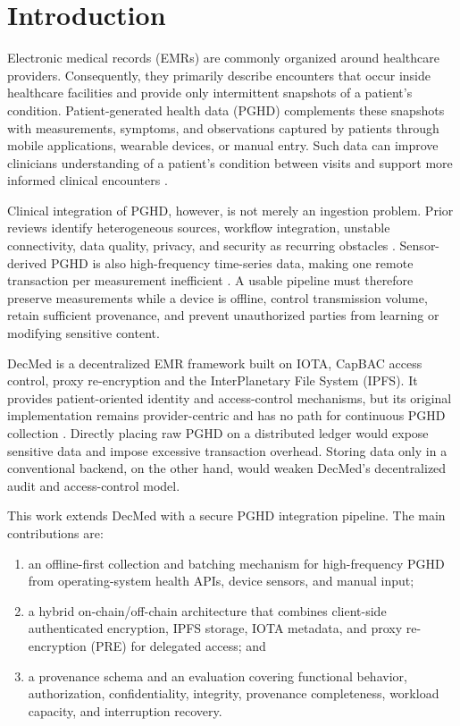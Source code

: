 \section{Introduction}

Electronic medical records (EMRs) are commonly organized around healthcare providers.
Consequently, they primarily describe encounters that occur inside healthcare facilities and provide only intermittent snapshots of a patient's condition.
Patient-generated health data (PGHD) complements these snapshots with measurements, symptoms, and observations captured by patients through mobile applications, wearable devices, or manual entry.
Such data can improve clinicians understanding of a patient's condition between visits and support more informed clinical encounters \cite{Cohen_Keller_Hayes_Dorr_Ash_Sittig_2016_PGHD_Integration_EHR,Omoloja_Vundavalli_2021_PGHD_Benefits_Challenges}.

Clinical integration of PGHD, however, is not merely an ingestion problem.
Prior reviews identify heterogeneous sources, workflow integration, unstable connectivity, data quality, privacy, and security as recurring obstacles \cite{Tiase2020-PGHD_EHR_Integration,Khatiwada_Yang_Lin_Blobel_2024_PGHD_Understanding}.
Sensor-derived PGHD is also high-frequency time-series data, making one remote transaction per measurement inefficient \cite{Haque_2024_Performance_Blockchain}.
A usable pipeline must therefore preserve measurements while a device is offline, control transmission volume, retain sufficient provenance, and prevent unauthorized parties from learning or modifying sensitive content.

DecMed is a decentralized EMR framework built on IOTA, CapBAC access control, proxy re-encryption and the InterPlanetary File System (IPFS).
It provides patient-oriented identity and access-control mechanisms, but its original implementation remains provider-centric and has no path for continuous PGHD collection \cite{Purnama_2026}.
Directly placing raw PGHD on a distributed ledger would expose sensitive data and impose excessive transaction overhead.
Storing data only in a conventional backend, on the other hand, would weaken DecMed's decentralized audit and access-control model.

This work extends DecMed with a secure PGHD integration pipeline.
The main contributions are:

\begin{enumerate}
	\item an offline-first collection and batching mechanism for high-frequency PGHD from operating-system health APIs, device sensors, and manual input;
	\item a hybrid on-chain/off-chain architecture that combines client-side authenticated encryption, IPFS storage, IOTA metadata, and proxy re-encryption (PRE) for delegated access; and
	\item a provenance schema and an evaluation covering functional behavior, authorization, confidentiality, integrity, provenance completeness, workload capacity, and interruption recovery.
\end{enumerate}

